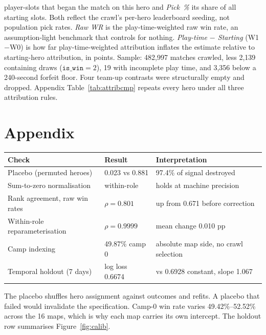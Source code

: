 \documentclass[11pt]{article}
\begin{document}
\begin{landscape}
\begin{minipage}{\linewidth}
player-slots that began the match on this hero and \emph{Pick~\%} its share of all
starting slots. Both reflect the crawl's per-hero leaderboard seeding, not population
pick rates. \emph{Raw WR} is the play-time-weighted raw win rate, an assumption-light
benchmark that controls for nothing. \emph{Play-time $-$ Starting} (W1$-$W0) is how far
play-time-weighted attribution inflates the estimate relative to starting-hero
attribution, in points. Sample: 482,997 matches crawled, less 2,139 containing
draws ($\texttt{is\_win}=2$), 19 with incomplete play time, and 3,356
below a 240-second forfeit floor. Four team-up contrasts were structurally empty and
dropped. Appendix Table~\ref{tab:attribcmp} repeats every hero under all three
attribution rules.
\end{minipage}
\end{landscape}

\clearpage
\appendix
\FloatBarrier
\section*{Appendix}
\renewcommand{\thetable}{A\arabic{table}}
\setcounter{table}{0}
\renewcommand{\thefigure}{A\arabic{figure}}
\setcounter{figure}{0}

\begin{center}\small
\begin{threeparttable}
\label{tab:checks}
\begin{tabular}{l l l}
\toprule
Check & Result & Interpretation \\
\midrule
Placebo (permuted heroes) & 0.023 vs 0.881 & 97.4\% of signal destroyed \\
Sum-to-zero normalisation & within-role & holds at machine precision \\
Rank agreement, raw win rates & $\rho=0.801$ & up from 0.671 before correction \\
Within-role reparameterisation & $\rho=0.9999$ & mean change 0.010 pp \\
Camp indexing & 49.87\% camp 0 & absolute map side, no crawl selection \\
Temporal holdout (7 days) & log loss 0.6674 & vs 0.6928 constant, slope 1.067 \\
\bottomrule
\end{tabular}
\begin{tablenotes}[flushleft]\footnotesize
\item The placebo shuffles hero assignment against outcomes and refits. A placebo
that failed would invalidate the specification. Camp-0 win rate varies
49.42\%--52.52\% across the 16 maps, which is why each map carries
its own intercept. The holdout row summarises Figure~\ref{fig:calib}.
\end{tablenotes}
\end{threeparttable}
\end{center}
\end{document}
